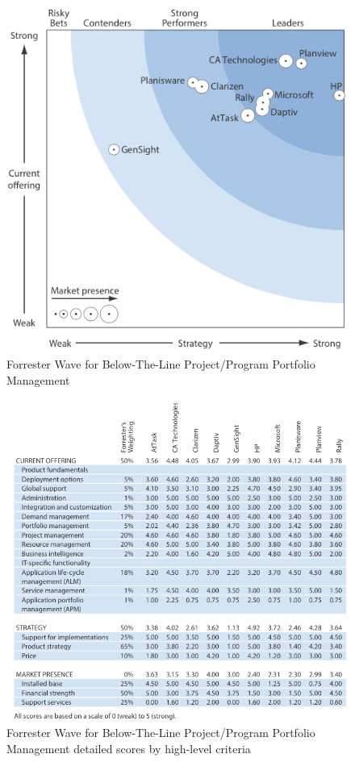 \begin{figure}
\centering
\includegraphics{img/BelowLineWave.png}
\caption{Forrester Wave for Below-The-Line Project/Program Portfolio Management}
\end{figure}

\begin{figure}
\centering
\includegraphics{img/BelowLineScores.png}
\caption{Forrester Wave for Below-The-Line Project/Program Portfolio Management detailed scores by high-level criteria}
\end{figure}

